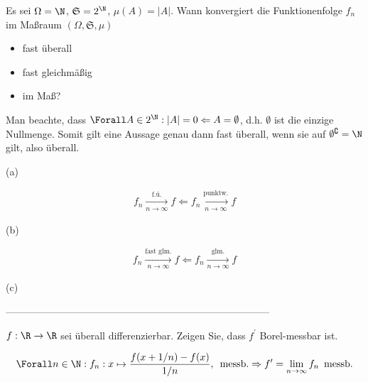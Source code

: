 \begin{exercise}

Es sei $\Omega = \N$, $\mathfrak{S} = 2^\N$, $\mu(A) = |A|$. Wann konvergiert die Funktionenfolge $f_n$ im Maßraum $(\Omega, \mathfrak{S}, \mu)$

\begin{itemize}
  \item[(a)] fast überall
  \item[(b)] fast gleichmäßig
  \item[(c)] im Maß?
\end{itemize}

\end{exercise}

\begin{solution}

Man beachte, dass $\Forall A \in 2^\N: |A| = 0 \Leftarrow A = \emptyset$, d.h. $\emptyset$ ist die einzige Nullmenge. Somit gilt eine Aussage genau dann fast überall, wenn sie auf $\emptyset^\complement = \N$ gilt, also überall.

(a)

\begin{align*}
  f_n \xrightarrow[n \to \infty]{\text{f.ü.}} f
  \Leftarrow
  f_n \xrightarrow[n \to \infty]{\text{punktw.}} f
\end{align*}

(b)

\begin{align*}
  f_n \xrightarrow[n \to \infty]{\text{fast glm.}} f
  \Leftarrow
  f_n \xrightarrow[n \to \infty]{\text{glm.}} f
\end{align*}

(c)

\end{solution}

--------------------------------------------------------------------------------

\begin{exercise}

$f: \R \to \R$ sei überall differenzierbar. Zeigen Sie, dass $f^\prime$ Borel-messbar ist.

\end{exercise}

\begin{solution}

\begin{align*}
  \Forall n \in \N:
  f_n: x \mapsto \frac{f(x + 1/n) - f(x)}{1/n},
  \enspace \text{messb.}
  \Rightarrow
  f^\prime = \lim_{n \to \infty} f_n
  \enspace \text{messb.}
\end{align*}

\end{solution}

